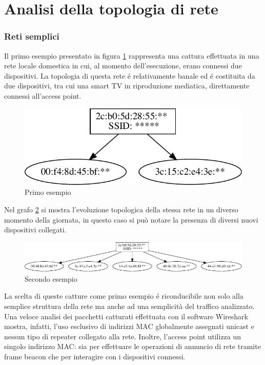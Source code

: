 \newpage 
\section{Analisi della topologia di rete}
\subsubsection{Reti semplici}

Il primo esempio presentato in figura \ref{fig:es1} rappresenta una cattura effettuata in una rete locale domestica in cui, al momento dell'esecuzione, erano connessi due dispositivi.
La topologia di questa rete \'e relativamente banale ed \'e costituita da due dispositivi, tra cui una smart TV in riproduzione mediatica, direttamente connessi all'access point.

\begin{figure}[!h]
	\centering
	\includegraphics{images/img8censored.pdf}
	\caption{Primo esempio}
	\label{fig:es1}
\end{figure}


Nel grafo \ref{fig:es2} si mostra l'evoluzione topologica della stessa rete in un diverso momento della giornata, in questo caso si pu\`o notare la presenza di diversi nuovi dispositivi collegati.
\begin{figure}[!h]
	\centering
	\includegraphics{images/img9censored.pdf}
	\caption{Secondo esempio}
	\label{fig:es2}
\end{figure}

La scelta di queste catture come primo esempio \'e riconducibile non solo alla semplice struttura della rete ma anche ad una semplicit\`a del traffico analizzato.
Una veloce analisi dei pacchetti catturati effettuata con il software Wireshark mostra, infatti, l'uso esclusivo di indirizzi MAC globalmente assegnati unicast e nessun tipo di repeater collegato alla rete.
Inoltre, l'access point utilizza un singolo indirizzo MAC: sia per effettuare le operazioni di annuncio di rete tramite frame beacon che per interagire con i dispositivi connessi.


